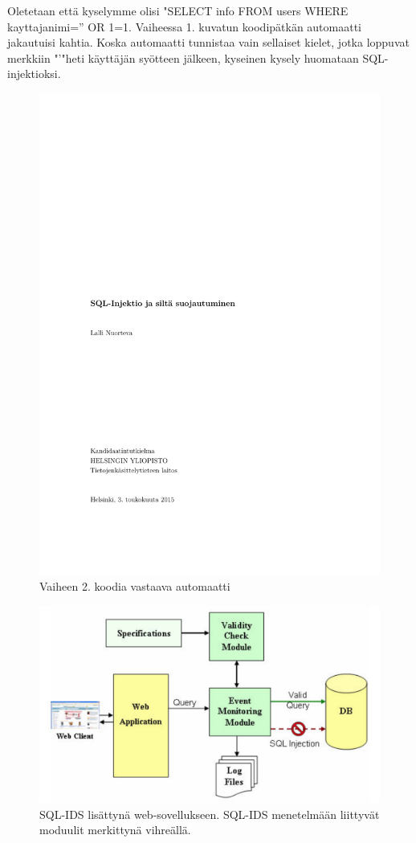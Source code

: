 \documentclass[finnish]{tktltiki2}
\theoremstyle{definition}
\theoremstyle{remark}
\begin{document}
\begin{enumerate}
		Oletetaan että kyselymme olisi "SELECT info FROM users WHERE kayttajanimi='' OR 1=1. Vaiheessa 1. kuvatun koodipätkän automaatti jakautuisi kahtia. Koska automaatti tunnistaa vain sellaiset kielet, jotka loppuvat merkkiin "\space'\space"\space heti käyttäjän syötteen jälkeen, kyseinen kysely huomataan SQL-injektioksi.
			\end{enumerate}
		\begin{figure}[h!]
		\caption{Vaiheen 2. koodia vastaava automaatti}
		\includegraphics[scale=0.5]{kandi}
		\end{figure}

		\begin{figure}[b!]
			\caption{SQL-IDS lisättynä web-sovellukseen. SQL-IDS menetelmään liittyvät moduulit merkittynä vihreällä. \cite{sqlids}}
			\includegraphics[scale=0.55]{sqlids}
		\end{figure}
		
\end{document}
